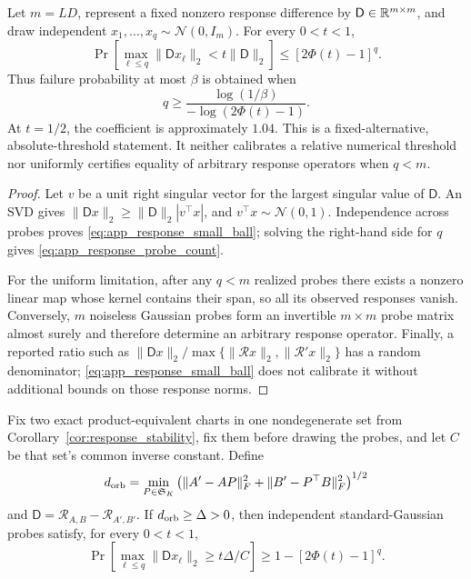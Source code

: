 \begin{proposition}
\label{prop:response_gaussian_probes}
Let \(m=LD\), represent a fixed nonzero response difference by
\(\mathsf D\in\mathbb{R}^{m\times m}\), and draw independent
\(x_1,\ldots,x_q\sim\mathcal N(0,I_m)\).  For every \(0<t<1\),
\begin{equation}
 \Pr\left[
   \max_{\ell\le q}\|\mathsf D x_\ell\|_2
   <t\|\mathsf D\|_2
 \right]
 \le[2\Phi(t)-1]^q.
 \label{eq:app_response_small_ball}
\end{equation}
Thus failure probability at most \(\beta\) is obtained when
\begin{equation}
 q\ge
 \frac{\log(1/\beta)}{-\log(2\Phi(t)-1)}.
 \label{eq:app_response_probe_count}
\end{equation}
At \(t=1/2\), the coefficient is approximately \(1.04\).
This is a fixed-alternative, absolute-threshold statement.  It neither
calibrates a relative numerical threshold nor uniformly certifies equality
of arbitrary response operators when \(q<m\).
\end{proposition}

\begin{proof}
Let \(v\) be a unit right singular vector for the largest singular value of
\(\mathsf D\).  An SVD gives
\(\|\mathsf D x\|_2\ge\|\mathsf D\|_2|v^\top x|\), and
\(v^\top x\sim\mathcal N(0,1)\).  Independence across probes proves
\eqref{eq:app_response_small_ball}; solving the right-hand side for \(q\)
gives \eqref{eq:app_response_probe_count}.

For the uniform limitation, after any \(q<m\) realized probes there exists a
nonzero linear map whose kernel contains their span, so all its observed
responses vanish.  Conversely, \(m\) noiseless Gaussian probes form an
invertible \(m\times m\) probe matrix almost surely and therefore determine an
arbitrary response operator.  Finally, a reported ratio such as
\(\|\mathsf D x\|_2/\max\{\|\mathcal R x\|_2,\|\mathcal R'x\|_2\}\) has a
random denominator; \eqref{eq:app_response_small_ball} does not calibrate it
without additional bounds on those response norms.
\end{proof}

\begin{corollary}
\label{cor:response_inverse_gaussian}
Fix two exact product-equivalent charts in one nondegenerate set from
Corollary~\ref{cor:response_stability}, fix them before drawing the probes,
and let $C$ be that set's common inverse constant.  Define
\[
 d_{\rm orb}=\min_{P\in\mathfrak S_K}
 \left(\|A'-AP\|_F^2+\|B'-P^\top B\|_F^2\right)^{1/2}
\]
and $\mathsf D=\mathcal R_{A,B}-\mathcal R_{A',B'}$.  If
$d_{\rm orb}\ge\Delta>0$, then independent standard-Gaussian probes satisfy,
for every $0<t<1$,
\begin{equation}
 \Pr\left[
   \max_{\ell\le q}\|\mathsf D x_\ell\|_2
   \ge t\Delta/C
 \right]
 \ge 1-[2\Phi(t)-1]^q.
 \label{eq:app_response_inverse_small_ball}
\end{equation}
\end{corollary}

